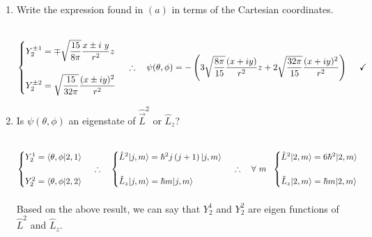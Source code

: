 \documentclass[fleqn]{article}
\begin{document}
\begin{enumerate}
\begin{enumerate}
      \item Write the expression found in $(a)$ in terms of the Cartesian coordinates.

        \textcolor{hwColor}{
          \\
          $
            \begin{cases}
              Y^{\pm1}_2=\mp \sqrt{\dfrac{15}{8\pi}} \dfrac{x\pm i ~ y}{r^2}z
              \\
              \\
              Y^{\pm2}_2=\sqrt{\dfrac{15}{32\pi}} \dfrac{(x\pm i y)^2}{r^2}
            \end{cases}
            \\
            \\
            \\
            \therefore ~~~  \psi(\theta, \phi)=-\left(
              3 \sqrt{\dfrac{8\pi}{15}} \dfrac{(x+iy)}{r^2}z
              +2 \sqrt{\dfrac{32 \pi}{15}} \dfrac{(x+iy)^2}{r^2}
            \right) ~~~~ \checkmark
          $
        }

      \item Is $\psi(\theta, \phi)$ an eigenstate of $\hat{\overrightarrow{L}}^2$ or $\hat{L}_z$?

        \textcolor{hwColor}{
          \\
          $
            \begin{cases}
              Y^1_2=\langle \theta, \phi|2, 1\rangle
              \\
              \\
              Y^2_2=\langle \theta, \phi|2, 2\rangle
            \end{cases}
            \\
            \\
            \\
            \therefore ~~~ \begin{cases}
              \hat{L}^2|j, m \rangle=\hbar^2 j \left(j+1\right)|j, m \rangle
              \\
              \\
              \hat{L}_z|j, m \rangle=\hbar m|j, m \rangle
            \end{cases}
            \\
            \\
            \\
            \therefore ~~~ \forall ~ m ~~ \begin{cases}
              \hat{L}^2|2,m \rangle=6 \hbar^2|2, m \rangle
              \\
              \\
              \hat{L}_z|2, m \rangle=\hbar m|2, m \rangle
            \end{cases}
          $
          \\
          \\
          Based on the above result, we can say that $Y^1_2$ and $Y^2_2$ are eigen functions of $\hat{L}^2$ and $\hat{L}_z$.
          \\
          \\
        }


\end{enumerate}
\end{enumerate}
\end{document}
